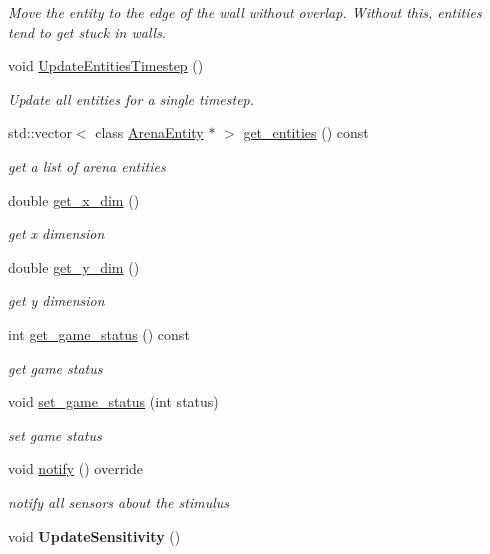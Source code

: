 \begin{DoxyCompactItemize}
\begin{DoxyCompactList}\small\item\em Move the entity to the edge of the wall without overlap. Without this, entities tend to get stuck in walls. \end{DoxyCompactList}\item 
void \hyperlink{classArena_a682ec81cb30e36e5bb801b3388bcb494}{Update\+Entities\+Timestep} ()
\begin{DoxyCompactList}\small\item\em Update all entities for a single timestep. \end{DoxyCompactList}\item 
std\+::vector$<$ class \hyperlink{classArenaEntity}{Arena\+Entity} $\ast$ $>$ \hyperlink{classArena_aabb4ffe05aefc71ee10d47b191963fe5}{get\+\_\+entities} () const 
\begin{DoxyCompactList}\small\item\em get a list of arena entities \end{DoxyCompactList}\item 
double \hyperlink{classArena_a5e3be20f2c67338a5a684b85a66f6b96}{get\+\_\+x\+\_\+dim} ()
\begin{DoxyCompactList}\small\item\em get x dimension \end{DoxyCompactList}\item 
double \hyperlink{classArena_a35737d65ff32f2bd5871f0bdfbc10a85}{get\+\_\+y\+\_\+dim} ()
\begin{DoxyCompactList}\small\item\em get y dimension \end{DoxyCompactList}\item 
int \hyperlink{classArena_a6d196837daa08a2618c3ff6e0a741b25}{get\+\_\+game\+\_\+status} () const 
\begin{DoxyCompactList}\small\item\em get game status \end{DoxyCompactList}\item 
void \hyperlink{classArena_ac8e8b3438db02aa5395f7fcb537ed952}{set\+\_\+game\+\_\+status} (int status)
\begin{DoxyCompactList}\small\item\em set game status \end{DoxyCompactList}\item 
void \hyperlink{classArena_a72ef246510cfec25a99fcb5a93be8147}{notify} () override\hypertarget{classArena_a72ef246510cfec25a99fcb5a93be8147}{}\label{classArena_a72ef246510cfec25a99fcb5a93be8147}

\begin{DoxyCompactList}\small\item\em notify all sensors about the stimulus \end{DoxyCompactList}\item 
void {\bfseries Update\+Sensitivity} ()\hypertarget{classArena_a4b1c801deddeb8e4460c05d90a0a97a2}{}\label{classArena_a4b1c801deddeb8e4460c05d90a0a97a2}

\end{DoxyCompactItemize}
